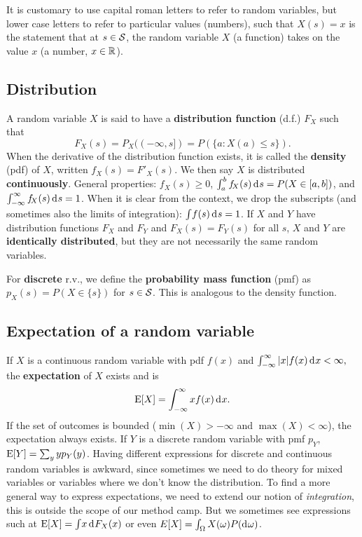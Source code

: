 \documentclass[10pt]{article}
\begin{document}
It is customary to use capital roman letters to refer to random variables, but
lower case letters to refer to particular values (numbers), such that $X(s)=x$
is the statement that at $s\in\mathcal{S}$, the random variable $X$ (a function) takes on the value $x$ (a number,
$x\in\mathbb{R}$).

\subsection{Distribution}
A random variable $X$ is said to have a \textbf{distribution function} (d.f.) $F_X$
such that \[ F_X(s) = P_X((-\infty, s])=P(\{a: X(a)\leq s\}).\] When the derivative of the
distribution function exists, it is called the \textbf{density} (pdf) of $X$, written
$f_{\!X}(s)=F'_X(s)$. We then say $X$ is distributed \textbf{continuously}. General
properties: $f_{\!X}(s)\geq0$, $\int_a^b f_{\!X}(s)\rd s = P(X\in[a,b])$, and
$\int_{-\infty}^\infty f_{\!X}(s) \rd s = 1$. When it is clear from the context, we drop the
subscripts (and sometimes also the limits of integration): $\int\! f(s)\rd s=1$.
If $X$ and $Y$ have distribution functions $F_X$ and $F_Y$ and $F_X(s)=F_Y(s)$ for all
$s$, $X$ and $Y$ are \textbf{identically distributed}, but they are not necessarily the
same random variables.

For \textbf{discrete} r.v., we define the \textbf{probability mass function} (pmf) as
$p_X(s) = P(X\in\{s\})$ for $s\in\mathcal{S}$. This is analogous to the density function.

\subsection{Expectation of a random variable}
If $X$ is a continuous random variable
with pdf $f(x)$ and 
\(\int_{-\infty}^\infty |x|f(x) \rd x < \infty,\)
the \textbf{expectation} of $X$ exists and is  
\[\E[X] = \int_{-\infty}^\infty xf(x) \rd x.\]
If the set of outcomes is bounded ($\min(X)> -\infty$ and $\max(X) < \infty$), 
the expectation always exists.
If $Y$ is a discrete random variable with pmf $p_Y$, 
$\operatorname{E}[Y]=\sum_y yp_Y(y)$. 
Having different expressions for discrete and continuous random variables is awkward, since
sometimes we need to do theory for mixed variables or variables where we don't know the 
distribution. To find a more general way to express expectations, we need to extend
our notion of \emph{integration}, this is outside the scope of our method camp. But we sometimes
see expressions such at $\E[X]=\int\! x \rd F_X(x)$
or even $E[X]=\int_\Omega X(\omega) P(\rd \omega)$.
\end{document}
